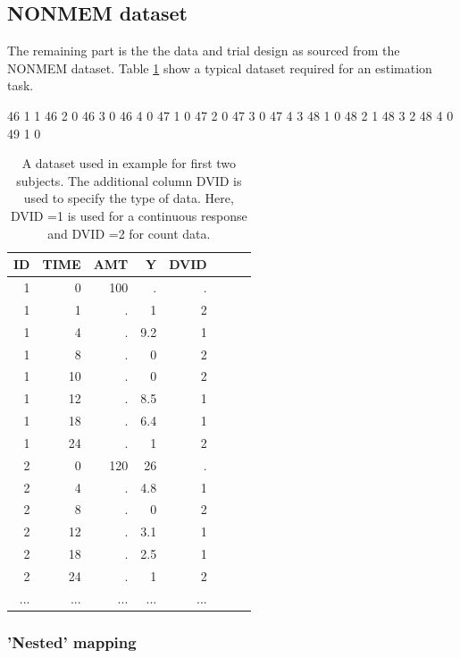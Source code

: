 \subsection{NONMEM dataset}
\label{sec:eg7-NONMEMdataset}
The remaining part is the the data and trial design as sourced from the 
NONMEM dataset. Table \ref{tab:example7_dataSet} show a typical dataset required for 
an estimation task.
\begin{table}[htdp]
\begin{center}
\small
46	1	1
46	2	0
46	3	0
46	4	0
47	1	0
47	2	0
47	3	0
47	4	3
48	1	0
48	2	1
48	3	2
48	4	0
49	1	0
\renewcommand{\arraystretch}{1.1}%
\begin{tabular}{rrrrrrrr}\toprule
ID 	& TIME	& AMT	& Y		& DVID \\ \midrule
1 	& 0 		& 100 	& . 		& . \\ 
1 	& 1 		& . 		& 1	 	& 2 \\ 
1 	& 4 		& . 		& 9.2 	& 1 \\ 
1 	& 8 		& . 		& 0 		& 2 \\ 
1 	& 10		& . 		& 0	 	& 2 \\ 
1 	& 12 	& . 		& 8.5 	& 1 \\ 
1 	& 18 	& . 		& 6.4 	& 1 \\ 
1 	& 24 	& . 		& 1 		& 2 \\ 
2 	& 0 		& 120	&  26 	& . \\ 
2 	& 4 		& . 		& 4.8 	& 1 \\ 
2 	& 8 		& . 		& 0 		& 2 \\ 
2 	& 12 	& . 		& 3.1 	& 1 \\ 
2 	& 18 	& . 		& 2.5 	& 1 \\ 
2 	& 24 	& . 		& 1 		& 2 \\ 
...	& ...		& ...		& ...		& ...	\\ \bottomrule
\end{tabular}
\end{center}
\caption{A dataset used in example for first two subjects.
The additional column DVID is used to specify the type of data. Here, 
DVID =1 is used for a continuous response and DVID =2 for count data.}
\label{tab:example7_dataSet}
\end{table}%

\subsubsection{'Nested' mapping}

